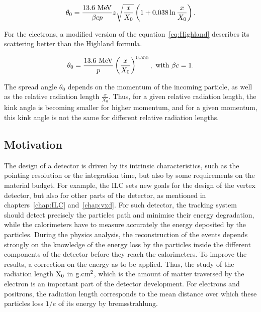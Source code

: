     \begin{equation}
      \theta_{0} = \frac{13.6~\rm{MeV}}{\beta c p} z \sqrt{\frac{x}{X_{0}}}\left(1 + 0.038 \ln{\frac{x}{X_{0}}}\right).
      \label{eq:Highland}
    \end{equation}

    For the electrons, a modified version of the equation~\ref{eq:Highland} describes its scattering better than the Highland formula\cite{GEANT4}.

    \begin{equation}
      \theta_{0} = \frac{13.6~\rm{MeV}}{p}\left(\frac{x}{X_{0}}\right)^{0.555},~\text{with $\beta c = 1$.}
      \label{eq:theta0}
    \end{equation}

    The spread angle $\theta_{0}$ depends on the momentum of the incoming particle, as well as the relative radiation length $\frac{x}{X_{0}}$.
    Thus, for a given relative radiation length, the kink angle is becoming smaller for higher momentum, and for a given momentum, this kink angle is not the same for different relative radiation lengths.

    \subsection{Motivation}

    The design of a detector is driven by its intrinsic characteristics, such as the pointing resolution or the integration time, but also by some requirements on the material budget.
    For example, the \gls{ILC} sets new goals for the design of the vertex detector, but also for other parts of the detector, as mentioned in chapters~\ref{chap:ILC} and~\ref{chap:vxd}.
    For such detector, the tracking system should detect precisely the particles path and minimise their energy degradation, while the calorimeters have to measure accurately the energy deposited by the particles.
    During the physics analysis, the reconstruction of the events depends strongly on the knowledge of the energy loss by the particles inside the different components of the detector before they reach the calorimeters. 
    To improve the results, a correction on the energy as to be applied.
    Thus, the study of the radiation length $\rm{X_{0}}$ in $\rm{g.cm}^{2}$, which is the amount of matter traversed by the electron is an important part of the detector development.
    For electrons and positrons, the radiation length corresponds to the mean distance over which these particles loss $1/e$ of its energy by bremsstrahlung.

